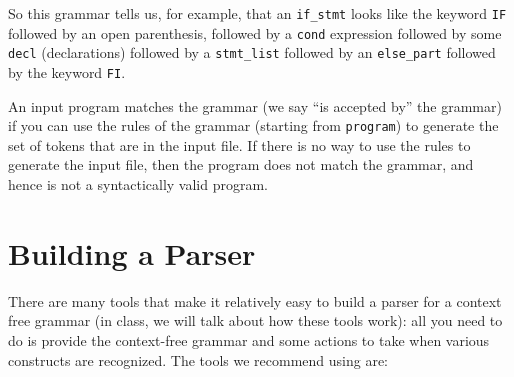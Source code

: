 \documentclass{article}
\begin{document}
So this grammar tells us, for example, that an \texttt{if\_stmt} looks like the keyword \texttt{IF} followed by an open parenthesis, followed by a \texttt{cond} expression followed by some \texttt{decl} (declarations) followed by a \texttt{stmt\_list} followed by an \texttt{else\_part} followed by the keyword \texttt{FI}.

An input program matches the grammar (we say ``is accepted by'' the grammar) if you can use the rules of the grammar (starting from \texttt{program}) to generate the set of tokens that are in the input file. If there is no way to use the rules to generate the input file, then the program does not match the grammar, and hence is not a syntactically valid program.

\section{Building a Parser}
There are many tools that make it relatively easy to build a parser for a context free grammar (in class, we will talk about how these tools work): all you need to do is provide the context-free grammar and some actions to take when various constructs are recognized. The tools we recommend using are: 
\end{document}
